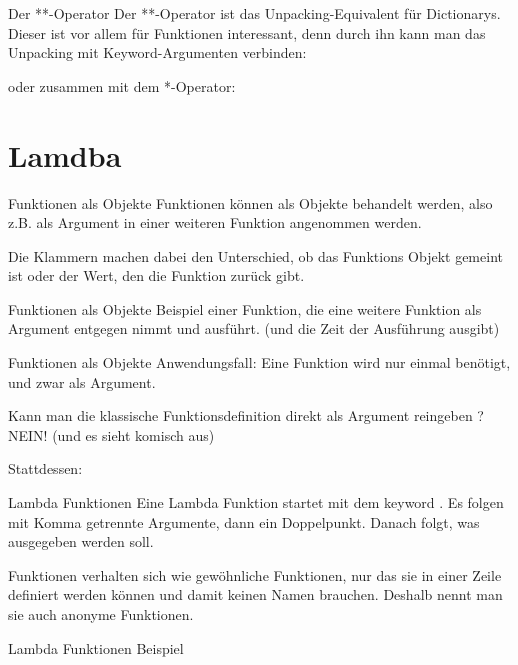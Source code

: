 \begin{frame}{Der **-Operator}
	Der **-Operator ist das Unpacking-Equivalent für Dictionarys. Dieser ist vor allem für Funktionen interessant, denn durch ihn kann man das Unpacking mit Keyword-Argumenten verbinden:
	
	oder zusammen mit dem *-Operator:
	
\end{frame}



\section{Lamdba}

\begin{frame}{Funktionen als Objekte}
	Funktionen können als Objekte behandelt werden, also z.B. als Argument in einer weiteren Funktion angenommen werden.
	
	
	Die Klammern machen dabei den Unterschied, ob das Funktions Objekt gemeint ist oder der Wert, den die Funktion zurück gibt.
\end{frame}

\begin{frame}{Funktionen als Objekte}
	Beispiel einer Funktion, die eine weitere Funktion  als Argument entgegen nimmt und ausführt. (und die Zeit der Ausführung ausgibt) 
	
\end{frame}

\begin{frame}{Funktionen als Objekte}
	Anwendungsfall: Eine Funktion wird nur einmal benötigt, und zwar als Argument.
	
	Kann man die klassische Funktionsdefinition direkt als Argument reingeben ? \alert{NEIN! (und es sieht komisch aus)}
	
	Stattdessen:
		
\end{frame}

\begin{frame}{Lambda Funktionen}
	Eine Lambda Funktion startet mit dem keyword . Es folgen mit Komma getrennte Argumente, dann ein Doppelpunkt. Danach folgt, was ausgegeben werden soll.
	
	 Funktionen verhalten sich wie gewöhnliche Funktionen, nur das sie in einer Zeile definiert werden können und damit keinen Namen brauchen. Deshalb nennt man sie auch \alert{anonyme Funktionen}.
\end{frame}

\begin{frame}{Lambda Funktionen}
	Beispiel 
	
\end{frame}


